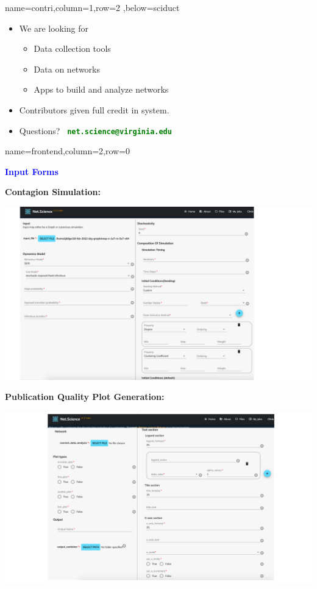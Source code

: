 \documentclass[landscape,paperwidth=70in,paperheight=46in,fontscale=0.225]{baposter} %
\begin{document}
\begin{poster}
          {name=contri,column=1,row=2 ,below=sciduct}{
\begin{itemize}[leftmargin=*,noitemsep,topsep=0pt]
\item We are looking for
\begin{itemize}
\item Data collection tools
\item Data on networks
\item Apps to build and analyze networks
\end{itemize}
\item Contributors given full credit in system.
\medskip
\item Questions?~ \textcolor{green}
        {\textbf{\texttt{net.science@virginia.edu}}}
\end{itemize}
\vspace*{0.2in}
}



          {name=frontend,column=2,row=0}{

\begin{center}
\textcolor{blue}{\large\textbf{Input Forms}}
\end{center}

\textbf{Contagion Simulation:}

\begin{center}
\includegraphics[scale=0.28]{figures/csonnet-model-seeds.pdf}
\end{center}

\textbf{Publication Quality Plot Generation:}

\begin{center}
\includegraphics[scale=0.28]{figures/plot_input.pdf}
\end{center}


}
\end{poster}
\end{document}
